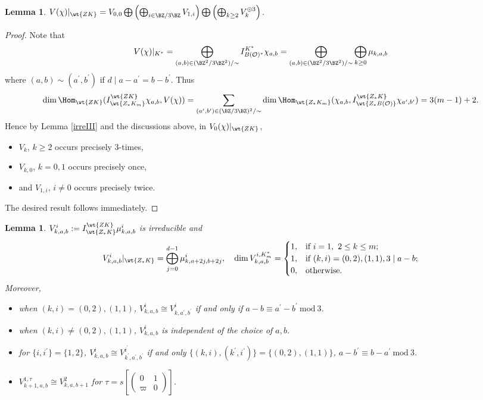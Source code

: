 \documentclass[11pt,reqno]{amsart}
\newcommand{\CO}{{\mathcal {O}}} \newcommand{\CP}{{\mathcal {P}}}
\renewcommand{\mod}{\ \mathrm{mod}\ }\renewcommand{\Re}{{\mathrm{Re}}}
\theoremstyle{plain}
\newtheorem{lem}[thm]{Lemma}  \newtheorem{prop}[thm]{Proposition}
\theoremstyle{remark} \newtheorem{remark}[thm]{Remark}
\theoremstyle{definition} \newtheorem{exercise}[thm]{Exercise}
\theoremstyle{definition} \newtheorem{example}[thm]{Example} \newtheorem{condition}[thm]{Condition}
\numberwithin{equation}{section}
\renewcommand{\-}{\text{--}}
\begin{document}
\begin{lem}\label{K-type I} $V(\chi)|_{\wt{ZK}}=V_{0,0}\bigoplus\left(\bigoplus_{i\in\BZ/3\BZ}V_{1,i}\right)\bigoplus \left(\bigoplus_{k\geq2}V_k^{\oplus 3}\right)$.
\end{lem}
\begin{proof}Note that \[V(\chi)|_{K^*}=\bigoplus_{(a,b)\in(\BZ^2/3\BZ^2)/\sim}I_{B(\CO)^*}^{K^*}\chi_{a,b}=\bigoplus_{(a,b)\in(\BZ^2/3\BZ^2)/\sim}\bigoplus_{k\geq0}\mu_{k,a,b}\]
where $(a,b)\sim (a^\prime,b^\prime)$ if $d\mid a-a^\prime=b-b^\prime$. Thus 
\[\dim \Hom_{\wt{ZK}}(I_{\wt{Z_*K_m}}^{\wt{ZK}}\chi_{a,b}, V(\chi))=\sum_{(a^\prime,b^\prime)\in(\BZ/3\BZ)^2/\sim}\dim\Hom_{\wt{Z_*K_m}}(\chi_{a,b}, I_{\wt{Z_*B(\CO)}}^{\wt{Z_*K}}\chi_{a^\prime,b^\prime})=3(m-1)+2.\]
Hence by Lemma \ref{irreIII} and the discussions above, in $V_0(\chi)| _{\wt{ZK}}$, 
\begin{itemize}
    \item $V_k$, $k\geq 2$ occurs precisely $3$-times,
    \item  $V_{k,0}$, $k=0,1$ occurs precisely once,
    \item and $V_{1,i}$, $i\neq0$ occurs precisely twice.
\end{itemize} 
The desired result follows immediately.
\end{proof}


\begin{lem}\label{irreIV}$V_{k,a,b}^i:=I_{\wt{Z_*K}}^{\wt{ZK}}\mu^i_{k,a,b}$ is irreducible and \[V_{k,a,b}^i|_{\wt{Z_*K}}=\bigoplus_{j=0}^{d-1}\mu^i_{k,a+2j,b+2j},\quad \dim V_{k,a,b}^{i,K_m^*}=\begin{cases} 1, &\text{if }i=1,\ 2\leq k\leq m;\\ 1, &\text{if } (k,i)=(0,2),(1,1), 3\mid a-b;\\
0,  & \text{otherwise}.\end{cases}\]
 Moreover, 
\begin{itemize}
    \item when $(k,i)=(0,2),(1,1)$, $V_{k,a,b}^i\cong V_{k,a^\prime,b^\prime}^i$ if and only if  $a-b\equiv a^\prime-b^\prime \mod 3$.
    
    \item when $(k,i)\neq(0,2),(1,1)$, $V^i_{k,a,b}$ is independent of the choice of $a,b$.
    \item for $\{i,i^\prime\}=\{1,2\}$, $V^i_{k,a,b}\cong V^{i^\prime}_{k^\prime,a^\prime,b^\prime}$ if and only $\{(k,i), (k^\prime,i^\prime)\}=\{(0,2),(1,1)\}$, $a-b^\prime\equiv b-a^\prime \mod 3$.
    \item  $V_{k+1,a,b}^{1,\tau}\cong V_{k,a,b+1}^{2}$ for $\tau=s\left[\begin{pmatrix} 0 & 1\\ \varpi & 0\end{pmatrix}\right]$. 
\end{itemize}

\end{lem}
\end{document}

